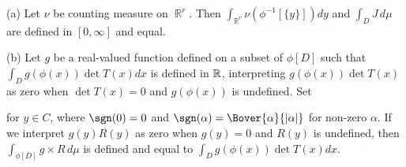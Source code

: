 (a) Let $\nu$ be counting measure on $\BbbR^r$.   Then
$\int_{\BbbR^r}\nu(\phi^{-1}[\{y\}])dy$ and
$\int_DJ\,d\mu$ are defined in $[0,\infty]$ and equal.

(b) Let $g$ be a real-valued function defined on a subset of $\phi[D]$
such that $\int_Dg(\phi(x))\det T(x)dx$ is defined in $\Bbb R$,
interpreting $g(\phi(x))\det T(x)$ as zero when $\det T(x)=0$ and
$g(\phi(x))$ is undefined.   Set


\noindent for $y\in C$, where $\sgn(0)=0$ and
$\sgn(\alpha)=\Bover{\alpha}{|\alpha|}$ for non-zero $\alpha$.
If we interpret $g(y)R(y)$ as zero when $g(y)=0$ and $R(y)$ is undefined,
then $\int_{\phi[D]}g\times R\,d\mu$ is defined and equal to
$\int_Dg(\phi(x))\det T(x)dx$.

